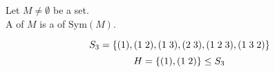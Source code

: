 \begin{frame}
  \begin{definition}
    Let $M \neq \emptyset$ be a set. \\
    A  of $M$ is a  of $\text{Sym}(M)$.
  \end{definition}

  \pause
  \[
    S_{3} = \{(1), (1\; 2), (1\; 3), (2\; 3), (1\; 2\; 3), (1\; 3\; 2)\}
  \]
  \pause
  \[
    H = \{(1), (1\; 2)\} \le S_{3}
  \]
\end{frame}
